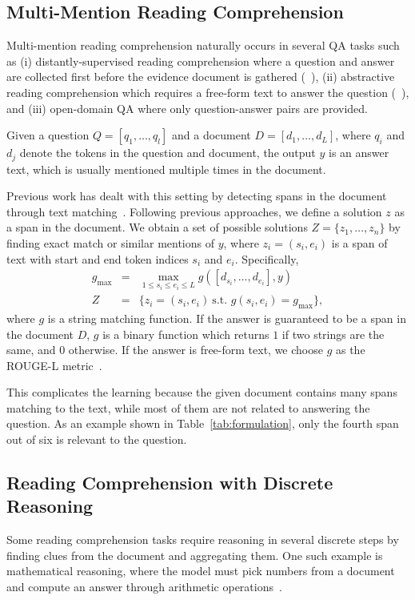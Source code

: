 \documentclass[11pt,a4paper]{article}
\begin{document}
\subsection{Multi-Mention Reading Comprehension}\label{subsec:dsr}
Multi-mention reading comprehension naturally occurs in several QA tasks such as (i) distantly-supervised reading comprehension where a question and answer are collected first before the evidence document is gathered (\eg\ \trivia), (ii) abstractive reading comprehension which requires a free-form text to answer the question (\eg\ \narrative), and (iii) open-domain QA where only question-answer pairs are provided.

Given a question $Q = [q_1, \dots, q_l]$ and a document $D = [d_1, \dots, d_L]$, where $q_i$ and $d_j$ denote the tokens in the question and document, the output $y$ is an answer text, which is usually mentioned multiple times in the document.

Previous work has dealt with this setting by detecting spans in the document through text matching~\citep{triviaqa, clark2018multi}.
Following previous approaches, we define a solution $z$ as a span in the document. We obtain a set of possible solutions $Z = \{ z_1, \dots, z_n \}$ by finding exact match or similar mentions of $y$, where $z_i=(s_i, e_i)$ is a span of text with start and end token indices $s_i$ and $e_i$. Specifically,
\begin{eqnarray*}
g_\text{max} &=& \max\limits_{1 \leq s_i \leq e_i \leq L }  g([d_{s_i}, \dots, d_{e_i}],  y) \\
    Z &=& \{z_i=(s_i, e_i)~\text{s.t. } g(s_i, e_i) = g_\text{max}\},
\end{eqnarray*}
where $g$ is a string matching function. If the answer is guaranteed to be a span in the document $D$, $g$ is a binary function which returns $1$ if two strings are the same, and $0$ otherwise. If the answer is free-form text, we choose $g$ as the ROUGE-L metric~\citep{lin2004rouge}.

This complicates the learning because the  given document contains many spans matching to the text, while most of them are not related to answering the question. As an example shown in Table~\ref{tab:formulation}, only the fourth span out of six is relevant to the question.


\subsection{Reading Comprehension with Discrete Reasoning}\label{subsec:drop-setup}
Some reading comprehension tasks require reasoning in several discrete steps by finding clues from the document and aggregating them. One such example is mathematical reasoning, where the model must pick numbers from a document and compute an answer through arithmetic operations~\cite{drop}. 
\end{document}
